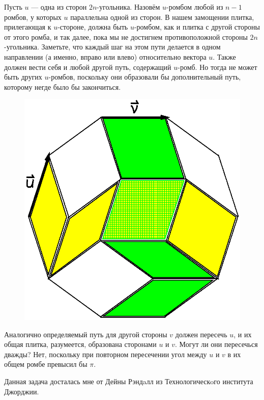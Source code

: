 Пусть $u$ --- одна из сторон $2n$-угольника.
Назовём $u$-ромбом любой из $n-1$ ромбов, у которых $u$ параллельна одной из сторон.
В нашем замощении плитка, прилегающая к $u$-стороне, должна быть $u$-ромбом, как и плитка с другой стороны от этого ромба, и так далее, пока мы не достигнем противоположной стороны $2n$-угольника.
Заметьте, что каждый шаг на этом пути делается в одном направлении (а именно, вправо или влево) относительно вектора $u$. 
Также должен вести себя и любой другой путь, содержащий $u$-ромб.
Но тогда не может быть других $u$-ромбов, поскольку они образовали бы дополнительный путь, которому негде было бы закончиться.

\begin{figure}[h!]
\centering
\includegraphics[scale=0.5]{Figs/Geometry/dimers}
\end{figure}

Аналогично определяемый путь для другой стороны $v$ должен пересечь $u$, и их общая плитка, разумеется, образована сторонами $u$ и $v$.
Могут ли они пересечься дважды?
Нет, поскольку при повторном пересечении угол между $u$ и $v$ в их общем ромбе превысил бы $\pi$.\heart

Данная задача досталась мне от Дейны Рэндaлл из Технологическoго института Джорджии.

